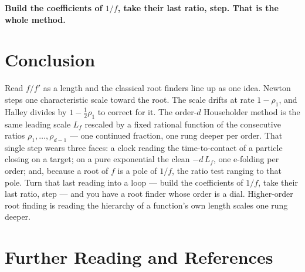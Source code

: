 \documentclass[11pt]{article}
\newcommand{\Lf}{L_{f}}                 %
\newcommand{\rr}{\rho}                  %
\newcommand{\order}{d}                  %
\begin{document}
\textbf{Build the coefficients of $1/f$, take their last ratio, step. That is the
whole method.}

\section{Conclusion}

Read $f/f'$ as a length and the classical root finders line up as one idea. Newton
steps one characteristic scale toward the root. The scale drifts at rate $1-\rr_1$,
and Halley divides by $1-\tfrac12\rr_1$ to correct for it. The order-$\order$
Householder method is the same leading scale $\Lf$ rescaled by a fixed rational
function of the consecutive ratios $\rr_1,\dots,\rr_{\order-1}$ --- one continued
fraction, one rung deeper per order. That single step wears three faces: a clock
reading the time-to-contact of a particle closing on a target; on a pure exponential
the clean $-\order\,\Lf$, one e-folding per order; and, because a root of $f$ is a
pole of $1/f$, the ratio test ranging to that pole. Turn that last reading into a loop
--- build the coefficients of $1/f$, take their last ratio, step --- and you have a
root finder whose order is a dial. Higher-order root finding is reading the hierarchy
of a function's own length scales one rung deeper.

\newpage
\section{Further Reading and References}
\end{document}
